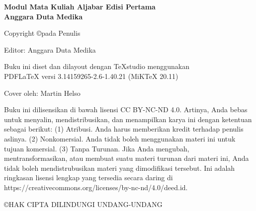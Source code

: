 {
	\centering
	
	\textbf{Modul Mata Kuliah Aljabar Edisi Pertama} \\
	\textbf{Anggara Duta Medika}
	
	\vspace{0.5cm}
	
	Copyright \copyright \space \the\year \space pada Penulis
	
	\vspace{0.5cm}
	
	Editor: Anggara Duta Medika
	
	\vspace{0.5cm}
	
	Buku ini diset dan dilayout dengan TeXstudio menggunakan \\
	PDFLaTeX versi 3.14159265-2.6-1.40.21 (MiKTeX 20.11)
	
	\vspace{0.5cm}
	
	Cover oleh: Martin Helso
	
	\vspace{0.5cm}
	
	\begin{center}
		Buku ini dilisensikan di bawah lisensi CC BY-NC-ND 4.0. Artinya, Anda bebas untuk menyalin, mendistribusikan, dan menampilkan karya ini dengan ketentuan sebagai berikut: (1) Atribusi. Anda harus memberikan kredit terhadap penulis aslinya. (2) Nonkomersial. Anda tidak boleh menggunakan materi ini untuk tujuan komersial. (3) Tanpa Turunan. Jika Anda mengubah, mentransformasikan, atau membuat suatu materi turunan dari materi ini, Anda tidak boleh mendistrubusikan materi yang dimodifikasi tersebut. Ini adalah ringkasan lisensi lengkap yang tersedia secara daring di https://creativecommons.org/licenses/by-nc-nd/4.0/deed.id.
	\end{center}
	
	\vspace{0.5cm}
	
	\begin{center}
		\copyright \space HAK CIPTA DILINDUNGI UNDANG-UNDANG
	\end{center}
}

\vspace*{\fill}